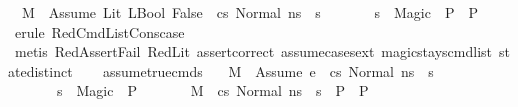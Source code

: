 \begin{isabellebody}
\ \ {\isachardoublequoteopen}{\isasymlbrakk}M{\isacharcomma}{\kern0pt}{\isasymLambda}{\isacharcomma}{\kern0pt}{\isasymGamma}{\isacharcomma}{\kern0pt}{\isasymDelta}\ {\isasymturnstile}\ {\isasymlangle}{\isacharparenleft}{\kern0pt}Assume\ {\isacharparenleft}{\kern0pt}Lit\ {\isacharparenleft}{\kern0pt}LBool\ False{\isacharparenright}{\kern0pt}{\isacharparenright}{\kern0pt}{\isacharparenright}{\kern0pt}\ {\isacharhash}{\kern0pt}\ cs{\isacharcomma}{\kern0pt}\ Normal\ ns{\isasymrangle}\ {\isacharbrackleft}{\kern0pt}{\isasymrightarrow}{\isacharbrackright}{\kern0pt}\ s{\isacharprime}{\kern0pt}{\isacharsemicolon}{\kern0pt}\isanewline
\ \ \ \ \ \ \ s{\isacharprime}{\kern0pt}\ {\isacharequal}{\kern0pt}\ Magic\ {\isasymLongrightarrow}\ P{\isasymrbrakk}\ {\isasymLongrightarrow}\ P{\isachardoublequoteclose}\isanewline
%
\isadelimproof
\ \ %
\endisadelimproof
%
\isatagproof
{}\isamarkupfalse%
\ {\isacharparenleft}{\kern0pt}erule\ RedCmdListCons{\isacharunderscore}{\kern0pt}case{\isacharparenright}{\kern0pt}\isanewline
\ \ \isamarkupfalse%
\ {\isacharparenleft}{\kern0pt}metis\ RedAssertFail\ RedLit\ assert{\isacharunderscore}{\kern0pt}correct\ assume{\isacharunderscore}{\kern0pt}cases{\isacharunderscore}{\kern0pt}ext\ magic{\isacharunderscore}{\kern0pt}stays{\isacharunderscore}{\kern0pt}cmd{\isacharunderscore}{\kern0pt}list\ state{\isachardot}{\kern0pt}distinct{\isacharparenleft}{\kern0pt}{}{\isacharparenright}{\kern0pt}{\isacharparenright}{\kern0pt}%
\endisatagproof
{\isafoldproof}%
%
\isadelimproof
\isanewline
%
\endisadelimproof
\isanewline
\ \ \isanewline
\isanewline
{}\isamarkupfalse%
\ assume{\isacharunderscore}{\kern0pt}true{\isacharunderscore}{\kern0pt}cmds{\isacharcolon}{\kern0pt}\ \isanewline
\ \ {\isachardoublequoteopen}{\isasymlbrakk}M{\isacharcomma}{\kern0pt}{\isasymLambda}{\isacharcomma}{\kern0pt}{\isasymGamma}{\isacharcomma}{\kern0pt}{\isasymDelta}\ {\isasymturnstile}\ {\isasymlangle}{\isacharparenleft}{\kern0pt}Assume\ e{\isacharparenright}{\kern0pt}\ {\isacharhash}{\kern0pt}\ cs{\isacharcomma}{\kern0pt}\ Normal\ ns{\isasymrangle}\ {\isacharbrackleft}{\kern0pt}{\isasymrightarrow}{\isacharbrackright}{\kern0pt}\ s{\isacharprime}{\kern0pt}{\isacharsemicolon}{\kern0pt}\isanewline
\ \ \ \ \ \ \ s{\isacharprime}{\kern0pt}\ {\isacharequal}{\kern0pt}\ Magic\ {\isasymLongrightarrow}\ P{\isacharsemicolon}{\kern0pt}\isanewline
\ \ \ \ \ \ \ M{\isacharcomma}{\kern0pt}{\isasymLambda}{\isacharcomma}{\kern0pt}{\isasymGamma}{\isacharcomma}{\kern0pt}{\isasymDelta}\ {\isasymturnstile}\ {\isasymlangle}cs{\isacharcomma}{\kern0pt}\ Normal\ ns{\isasymrangle}\ {\isacharbrackleft}{\kern0pt}{\isasymrightarrow}{\isacharbrackright}{\kern0pt}\ s{\isacharprime}{\kern0pt}\ {\isasymLongrightarrow}\ P{\isasymrbrakk}\ {\isasymLongrightarrow}\ P{\isachardoublequoteclose}\isanewline

\end{isabellebody}

